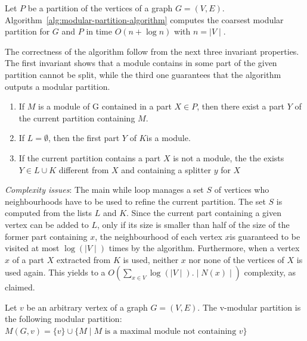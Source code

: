 \begin{mytheo}
    Let $P$ be a partition of the vertices of a graph $G = (V, E)$.
    Algorithm~\ref{alg:modular-partition-algorithm} computes the coarsest modular partition for $G$ and $P$ in time $O(n + \log{n})$ with $n = \mid V \mid$.
\end{mytheo}

The correctness of the algorithm follow from the next three invariant properties.
The first invariant shows that a module contains in some part of the given partition cannot be split, while the third one guarantees that the algorithm outputs a modular partition.

\begin{enumerate}
    \item If $M$ is a module of G contained in a part $X \in P$, then there exist a part $Y$ of the current partition containing $M$.
    \item If $L = \emptyset$, then the first part $Y$ of $K$is a module.
    \item If the current partition contains a part $X$ is not a module, the the exists $Y \in L \cup K$ different from $X$ and containing a splitter $y$ for $X$
\end{enumerate}

\textit{Complexity issues}: The main while loop manages a set $S$ of vertices who neighbourhoods have to be used to refine the current partition.
The set $S$ is computed from the lists $L$ and $K$.
Since the current part containing a given vertex can be added to $L$, only if its size is smaller than half of the size of the former part containing $x$, the neighbourhood of each vertex $x $is guaranteed to be visited at most $\log{(\mid V \mid)}$ times by the algorithm.
Furthermore, when a vertex $x$ of a part $X$ extracted from $K$ is used, neither $x$ nor none of the vertices of $X$ is used again.
This yields to a $O\left(\sum_{x \in V} \log{(\mid V \mid)}.\mid N (x) \mid\right)$ complexity, as claimed.



\begin{mydef}
    Let $v$ be an arbitrary vertex of a graph $G = (V, E)$.
    The v-modular partition is the following modular partition: \\
    $M(G, v) = \{v\} \cup \{M \mid M \text{ is a maximal module not containing } v\}$
\end{mydef}

